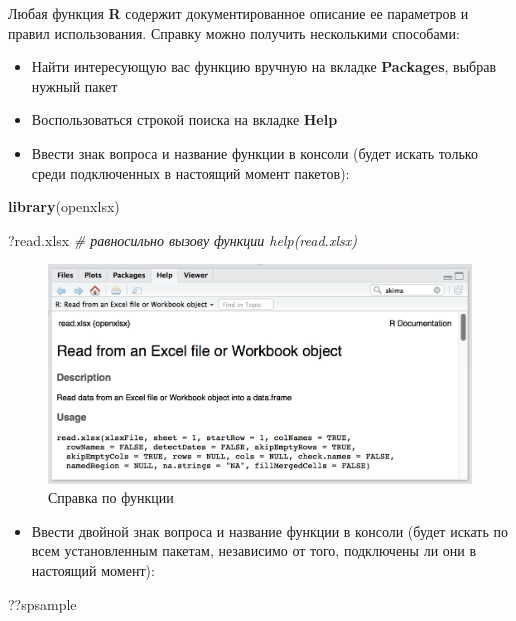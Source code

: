 \documentclass[]{book}
\newenvironment{Shaded}{\begin{snugshade}}{\end{snugshade}}
\newcommand{\KeywordTok}[1]{\textcolor[rgb]{0.13,0.29,0.53}{\textbf{#1}}}
\newcommand{\CommentTok}[1]{\textcolor[rgb]{0.56,0.35,0.01}{\textit{#1}}}
\newcommand{\NormalTok}[1]{#1}
\providecommand{\tightlist}{%
  \setlength{\itemsep}{0pt}\setlength{\parskip}{0pt}}
\begin{document}
Любая функция \textbf{R} содержит документированное описание ее
параметров и правил использования. Справку можно получить несколькими
способами:

\begin{itemize}
\tightlist
\item
  Найти интересующую вас функцию вручную на вкладке \textbf{Packages},
  выбрав нужный пакет
\item
  Воспользоваться строкой поиска на вкладке \textbf{Help}
\item
  Ввести знак вопроса и название функции в консоли (будет искать только
  среди подключенных в настоящий момент пакетов):
\end{itemize}

\begin{Shaded}
\begin{Highlighting}[]
\KeywordTok{library}\NormalTok{(openxlsx)}

\NormalTok{?read.xlsx }\CommentTok{# равносильно вызову функции help(read.xlsx)}
\end{Highlighting}
\end{Shaded}

\begin{figure}
\centering
\includegraphics{images/ch0_openxlsx.png}
\caption{Справка по функции}
\end{figure}

\begin{itemize}
\tightlist
\item
  Ввести двойной знак вопроса и название функции в консоли (будет искать
  по всем установленным пакетам, независимо от того, подключены ли они в
  настоящий момент):
\end{itemize}

\begin{Shaded}
\begin{Highlighting}[]
\NormalTok{??spsample}
\end{Highlighting}
\end{Shaded}
\end{document}
